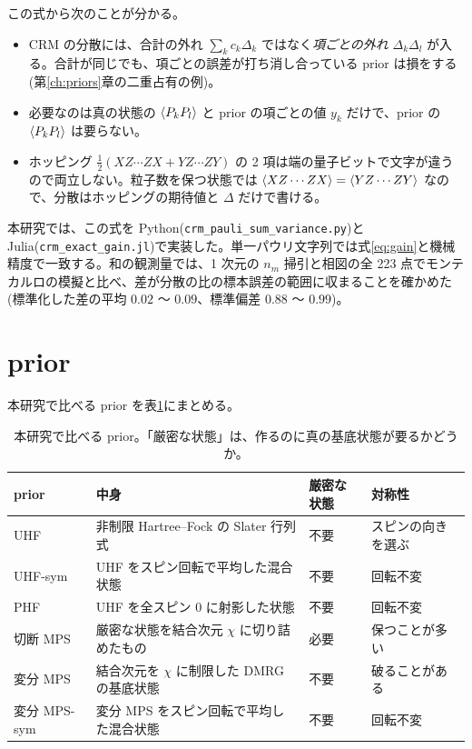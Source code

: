 この式から次のことが分かる。
\begin{itemize}
  \item CRM の分散には、合計の外れ $\sum_kc_k\Delta_k$ ではなく\emph{項ごとの外れ} $\Delta_k\Delta_l$ が入る。合計が同じでも、項ごとの誤差が打ち消し合っている prior は損をする(第\ref{ch:priors}章の二重占有の例)。
  \item 必要なのは真の状態の $\langle P_kP_l\rangle$ と prior の項ごとの値 $y_k$ だけで、prior の $\langle P_kP_l\rangle$ は要らない。
  \item ホッピング $\tfrac12(XZ\cdots ZX+YZ\cdots ZY)$ の 2 項は端の量子ビットで文字が違うので両立しない。粒子数を保つ状態では $\langle XZ\cdots ZX\rangle=\langle YZ\cdots ZY\rangle$ なので、分散はホッピングの期待値と $\Delta$ だけで書ける。
\end{itemize}
本研究では、この式を Python(\texttt{crm\_pauli\_sum\_variance.py})と Julia(\texttt{crm\_exact\_gain.jl})で実装した。単一パウリ文字列では式\eqref{eq:gain}と機械精度で一致する。和の観測量では、1 次元の $n_m$ 掃引と相図の全 223 点でモンテカルロの模擬と比べ、差が分散の比の標本誤差の範囲に収まることを確かめた(標準化した差の平均 $0.02$ 〜 $0.09$、標準偏差 $0.88$ 〜 $0.99$)。

\section{prior}
\label{sec:priors}

本研究で比べる prior を表\ref{tab:priors}にまとめる。

\begin{table}[t]
\centering\small
\caption{本研究で比べる prior。「厳密な状態」は、作るのに真の基底状態が要るかどうか。}
\label{tab:priors}
\begin{tabular}{@{}llll@{}}
\toprule
prior & 中身 & 厳密な状態 & 対称性 \\
\midrule
UHF & 非制限 Hartree--Fock の Slater 行列式 & 不要 & スピンの向きを選ぶ \\
UHF-sym & UHF をスピン回転で平均した混合状態 & 不要 & 回転不変 \\
PHF & UHF を全スピン 0 に射影した状態 & 不要 & 回転不変 \\
切断 MPS & 厳密な状態を結合次元 $\chi$ に切り詰めたもの & 必要 & 保つことが多い \\
変分 MPS & 結合次元を $\chi$ に制限した DMRG の基底状態 & 不要 & 破ることがある \\
変分 MPS-sym & 変分 MPS をスピン回転で平均した混合状態 & 不要 & 回転不変 \\
\bottomrule
\end{tabular}
\end{table}

